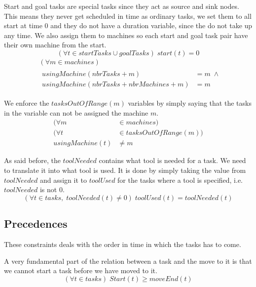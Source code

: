   \noindent Start and goal tasks are special tasks since they act as source and sink nodes. This means they never get scheduled in time as ordinary tasks, we set them to all start at time $0$ and they do not have a duration variable, since the do not take up any time. We also assign them to machines so each start and goal task pair have their own machine from the start.
 \begin{equation}\label{eq:93}
 (\forall t \in startTasks \cup goalTasks) \; start(t) = 0
 \end{equation}
 \begin{equation}
 \begin{aligned}\label{eq:94}
 &(\forall m \in machines) \\
 &\begin{aligned}
 usingMachine(nbrTasks + m) &= m \; \land\\
 usingMachine(nbrTasks + nbrMachines + m) &= m
 \end{aligned}
 \end{aligned}
 \end{equation}

  \noindent We enforce the $tasksOutOfRange(m)$ variables by simply saying that the tasks in the variable can not be assigned the machine $m$.
 \begin{equation}\label{eq:95}
 \begin{aligned}
 (\forall m &\in machines) \\
 (\forall t &\in tasksOutOfRange(m)) \\
 usingMachine(t) &\neq m
 \end{aligned}
 \end{equation}

  \noindent As said before, the $toolNeeded$ contains what tool is needed for a task. We need to translate it into what tool is used. It is done by simply taking the value from $toolNeeded$ and assign it to $toolUsed$ for the tasks where a tool is specified, i.e. $toolNeeded$ is not $0$.
 \begin{equation}\label{eq:117}
 (\forall t \in tasks, \; toolNeeded(t) \neq 0) \; toolUsed(t) = toolNeeded(t)
 \end{equation}

 
 \subsection{Precedences}
 These constraints deals with the order in time in which the tasks has to come.

  \noindent A very fundamental part of the relation between a task and the move to it is that we cannot start a task before we have moved to it.
  \begin{equation}\label{eq:107}
  (\forall t \in tasks) \; Start(t) \geq moveEnd(t)
  \end{equation}

